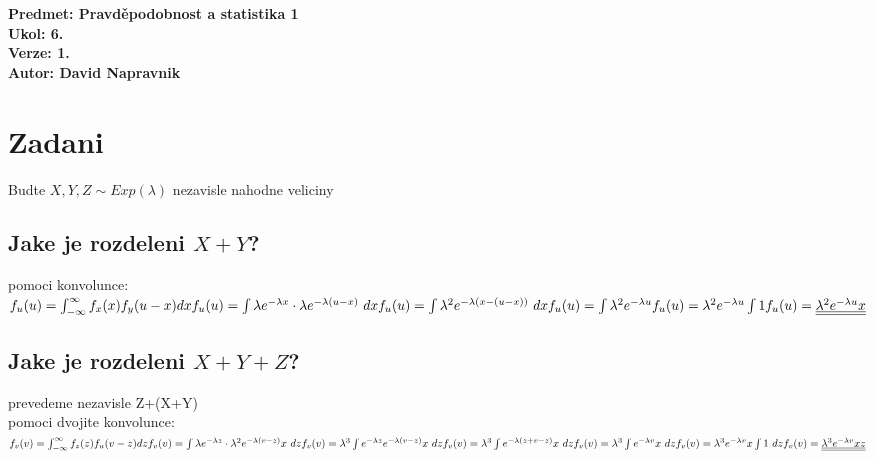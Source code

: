 \documentclass[a4paper]{article}
\def\doubleunderline#1{\underline{\underline{#1}}}
\begin{document}
\noindent
\textbf{Predmet: Pravděpodobnost a statistika 1}\\
\textbf{Ukol: 6.}\\
\textbf{Verze: 1.}\\
\textbf{Autor: David Napravnik}

\section*{Zadani}
Budte $X,Y,Z\sim Exp(\lambda)$ nezavisle nahodne veliciny

\subsection*{Jake je rozdeleni $X+Y$?}
pomoci konvolunce:\\
$
f_u(u) = \int_{-\infty}^\infty{f_x(x)f_y(u-x)dx} \\
f_u(u) = \int{\lambda e^{-\lambda x}\cdot\lambda e^{-\lambda(u-x)}~dx} \\
f_u(u) = \int{\lambda^2 e^{-\lambda(x-(u-x))}~dx} \\
f_u(u) = \int{\lambda^2 e^{-\lambda u}} \\
f_u(u) = \lambda^2 e^{-\lambda u} \int{1} \\
f_u(u) = \doubleunderline{\lambda^2 e^{-\lambda u} x} \\
$






\subsection*{Jake je rozdeleni $X+Y+Z$?}
prevedeme nezavisle Z+(X+Y)\\
pomoci dvojite konvolunce:\\
$
f_v(v) = \int_{-\infty}^\infty{f_z(z)f_u(v-z)dz} \\
f_v(v) = \int{\lambda e^{-\lambda z}\cdot\lambda^2 e^{-\lambda (v-z)} x~dz} \\
f_v(v) = \lambda^3 \int{e^{-\lambda z} e^{-\lambda (v-z)} x~dz} \\
f_v(v) = \lambda^3 \int{e^{-\lambda (z+v-z)}x~dz} \\
f_v(v) = \lambda^3 \int{e^{-\lambda v}x~dz} \\
f_v(v) = \lambda^3 e^{-\lambda v} x \int{1~dz} \\
f_v(v) = \doubleunderline{\lambda^3 e^{-\lambda v} x z} \\
$
\end{document}
